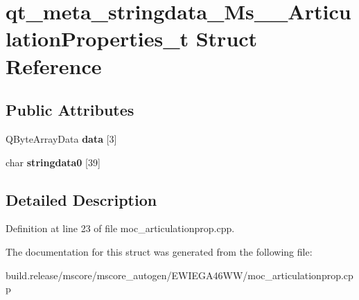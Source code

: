 \hypertarget{structqt__meta__stringdata___ms_____articulation_properties__t}{}\section{qt\+\_\+meta\+\_\+stringdata\+\_\+\+Ms\+\_\+\+\_\+\+Articulation\+Properties\+\_\+t Struct Reference}
\label{structqt__meta__stringdata___ms_____articulation_properties__t}
\subsection*{Public Attributes}
\begin{DoxyCompactItemize}
\item 
\mbox{\label{structqt__meta__stringdata___ms_____articulation_properties__t_a06165012927d07d67fc4dd3c806b606c}} 
Q\+Byte\+Array\+Data {\bfseries data} \mbox{[}3\mbox{]}
\item 
\mbox{\label{structqt__meta__stringdata___ms_____articulation_properties__t_a179025f4984ddc61573ef2d46b87c513}} 
char {\bfseries stringdata0} \mbox{[}39\mbox{]}
\end{DoxyCompactItemize}


\subsection{Detailed Description}


Definition at line 23 of file moc\+\_\+articulationprop.\+cpp.



The documentation for this struct was generated from the following file\+:\begin{DoxyCompactItemize}
\item 
build.\+release/mscore/mscore\+\_\+autogen/\+E\+W\+I\+E\+G\+A46\+W\+W/moc\+\_\+articulationprop.\+cpp\end{DoxyCompactItemize}
